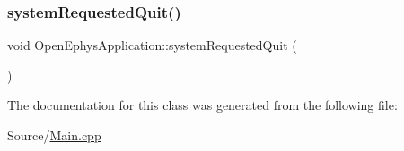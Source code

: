 \mbox{\label{class_open_ephys_application_ab5b3ad9b64ab7d1e4022b967affe3d36}} 
\subsubsection{\texorpdfstring{system\+Requested\+Quit()}{systemRequestedQuit()}}
{\footnotesize\ttfamily void Open\+Ephys\+Application\+::system\+Requested\+Quit (\begin{DoxyParamCaption}{ }\end{DoxyParamCaption})\hspace{0.3cm}{\ttfamily [inline]}}



The documentation for this class was generated from the following file\+:\begin{DoxyCompactItemize}
\item 
Source/\mbox{\hyperlink{_main_8cpp}{Main.\+cpp}}\end{DoxyCompactItemize}
